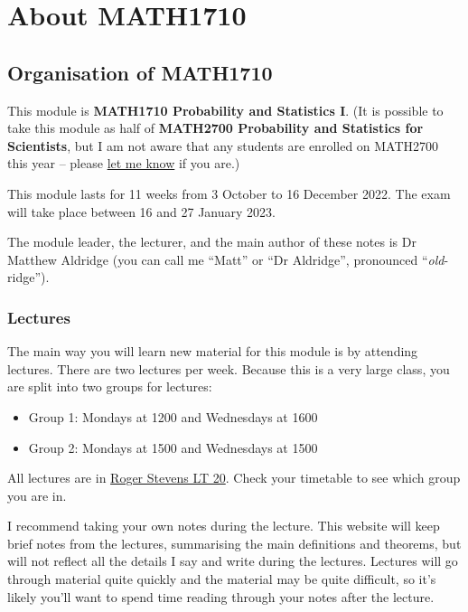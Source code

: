 \documentclass[
  a4paper,
]{book}
\providecommand{\tightlist}{%
  \setlength{\itemsep}{0pt}\setlength{\parskip}{0pt}}
\theoremstyle{definition}
\theoremstyle{definition}
\theoremstyle{definition}
\theoremstyle{definition}
\theoremstyle{remark}
\begin{document}
\hypertarget{about}{%
\chapter*{About MATH1710}\label{about}}

\hypertarget{organisation}{%
\section*{Organisation of MATH1710}\label{organisation}}

This module is \textbf{MATH1710 Probability and Statistics I}. (It is possible to take this module as half of \textbf{MATH2700 Probability and Statistics for Scientists}, but I am not aware that any students are enrolled on MATH2700 this year -- please \href{mailto:m.aldridge@leeds.ac.uk}{let me know} if you are.)

This module lasts for 11 weeks from 3 October to 16 December 2022. The exam will take place between 16 and 27 January 2023.

The module leader, the lecturer, and the main author of these notes is Dr Matthew Aldridge (you can call me ``Matt'' or ``Dr Aldridge'', pronounced ``\emph{old}-ridge'').

\hypertarget{lectures}{%
\subsection*{Lectures}\label{lectures}}

The main way you will learn new material for this module is by attending lectures. There are two lectures per week. Because this is a very large class, you are split into two groups for lectures:

\begin{itemize}
\tightlist
\item
  Group 1: Mondays at 1200 and Wednesdays at 1600
\item
  Group 2: Mondays at 1500 and Wednesdays at 1500
\end{itemize}

All lectures are in \href{https://students.leeds.ac.uk/rooms?type=room\&id=100044}{Roger Stevens LT 20}. Check your timetable to see which group you are in.

I recommend taking your own notes during the lecture. This website will keep brief notes from the lectures, summarising the main definitions and theorems, but will not reflect all the details I say and write during the lectures. Lectures will go through material quite quickly and the material may be quite difficult, so it's likely you'll want to spend time reading through your notes after the lecture.
\end{document}
